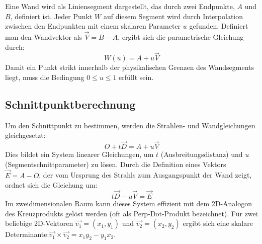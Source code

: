 \documentclass{article}
\begin{document}
    Eine Wand wird als Liniensegment dargestellt, das durch zwei Endpunkte, $A$ und $B$, definiert ist.
    Jeder Punkt $W$ auf diesem Segment wird durch Interpolation zwischen den Endpunkten mit einem skalaren Parameter $u$ gefunden.
    Definiert man den Wandvektor als $\vec{V} = B - A$, ergibt sich die parametrische Gleichung durch:
    \[W(u) = A + u\vec{V}\]
    Damit ein Punkt strikt innerhalb der physikalischen Grenzen des Wandsegments liegt, muss die Bedingung $0 \le u \le 1$ erfüllt sein.

    \subsection{Schnittpunktberechnung}\label{subsec:intersection-formula}


    Um den Schnittpunkt zu bestimmen, werden die Strahlen- und Wandgleichungen gleichgesetzt:
    \[O + t\vec{D} = A + u\vec{V}\]
    Dies bildet ein System linearer Gleichungen, um $t$ (Ausbreitungsdistanz) und $u$ (Segmentschnittparameter) zu lösen.
    Durch die Definition eines Vektors $\vec{E} = A - O$, der vom Ursprung des Strahls zum Ausgangspunkt der Wand zeigt, ordnet sich die Gleichung um:
    \[t\vec{D} - u\vec{V} = \vec{E}\]
    Im zweidimensionalen Raum kann dieses System effizient mit dem 2D-Analogon des Kreuzprodukts gelöst werden (oft als Perp-Dot-Produkt bezeichnet).
    Für zwei beliebige 2D-Vektoren $\vec{v_1} = (x_1, y_1)$ und $\vec{v_2} = (x_2, y_2)$ ergibt sich eine skalare Determinante:$\vec{v_1} \times \vec{v_2} = x_1 y_2 - y_1 x_2$.
\end{document}
